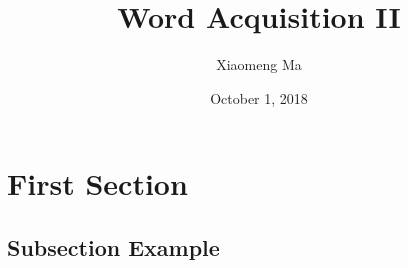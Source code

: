 \documentclass{beamer}
\title[LNG 230/SPV 221 Language Acquisition]{Word Acquisition II} %
\author{Xiaomeng Ma} %
\institute[Graduate Center, CUNY] %
{Graduate Center, CUNY \\ %
\medskip
\textit{xma3@gradcenter.cuny.edu} %
}
\date{October 1, 2018} %
\begin{document}
\begin{frame}
\titlepage %
\end{frame}



\section{First Section} %

\subsection{Subsection Example} %
\end{document}
